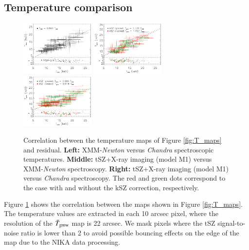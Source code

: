 \documentclass[twocolumn,traditabstract]{aa}
\begin{document}
\subsection{Temperature comparison}\label{sec:compT}
\begin{figure}[h]
\centering
\includegraphics[width=0.33\textwidth]{Figure/Thermo_correlation_TXMM-TCXO.pdf}
\includegraphics[width=0.33\textwidth]{Figure/Thermo_correlation_TXMM-TSZ_leff1.pdf}
\includegraphics[width=0.33\textwidth]{Figure/Thermo_correlation_TCXO-TSZ_leff1.pdf}
\caption{\footnotesize{Correlation between the temperature maps of Figure \ref{fig:T_maps} and residual. {\bf Left:} XMM-\textit{Newton} versus \textit{Chandra} spectroscopic temperatures. {\bf Middle:} tSZ+X-ray imaging (model M1) versus XMM-\textit{Newton} spectroscopy. {\bf Right:} tSZ+X-ray imaging (model M1) versus \textit{Chandra} spectroscopy. The red and green dots correspond to the case with and without the kSZ correction, respectively.}}
\label{fig:T_SZ_T_X_correlation}
\end{figure}

Figure \ref{fig:T_SZ_T_X_correlation} shows the correlation between the maps shown in Figure \ref{fig:T_maps}. The temperature values are extracted in each 10 arcsec pixel, where the resolution of the $\bar{T}_{\rm gmw}$ map is 22 arcsec. We mask pixels where the tSZ signal-to-noise ratio is lower than 2 to avoid possible bouncing effects on the edge of the map due to the NIKA data processing.
\end{document}
